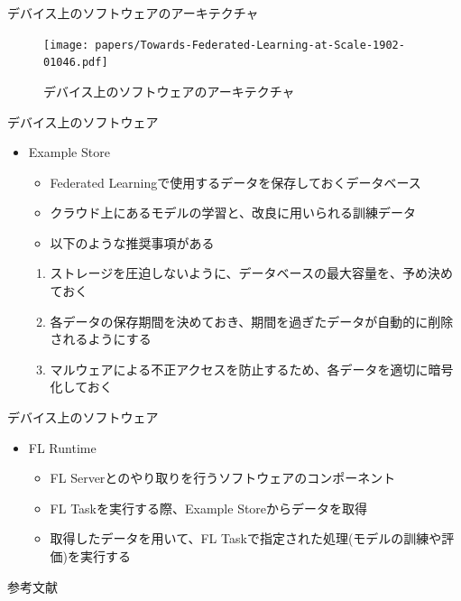 \documentclass[dvipdfmx,notheorems,t]{beamer}
\begin{document}
\begin{frame}{デバイス上のソフトウェアのアーキテクチャ}

\begin{figure}
	\centering
	\texttt{[image: papers/Towards-Federated-Learning-at-Scale-1902-01046.pdf]}
	\caption{デバイス上のソフトウェアのアーキテクチャ~\cite{DBLP:journals/corr/abs-1902-01046}}
	\label{fig:fl-device-arch}
\end{figure}

\end{frame}

\begin{frame}{デバイス上のソフトウェア}

\begin{itemize}
	\item \alert{Example Store}
	\begin{itemize}
		\item Federated Learningで使用するデータを保存しておくデータベース
		\item クラウド上にあるモデルの学習と、改良に用いられる訓練データ
		\newline
		
		\item 以下のような推奨事項がある
	\end{itemize}
	
	\begin{enumerate}
		\item ストレージを圧迫しないように、データベースの最大容量を、予め決めておく
		\item 各データの保存期間を決めておき、期間を過ぎたデータが自動的に削除されるようにする
		\item マルウェアによる不正アクセスを防止するため、各データを適切に暗号化しておく
	\end{enumerate}
\end{itemize}

\end{frame}

\begin{frame}{デバイス上のソフトウェア}

\begin{itemize}
	\item \alert{FL Runtime}
	\begin{itemize}
		\item FL Serverとのやり取りを行うソフトウェアのコンポーネント
		\newline
		
		\item FL Taskを実行する際、Example Storeからデータを取得
		\item 取得したデータを用いて、FL Taskで指定された処理(モデルの訓練や評価)を実行する
	\end{itemize}
\end{itemize}

\end{frame}

\begin{frame}{参考文献}




\end{frame}
\end{document}
